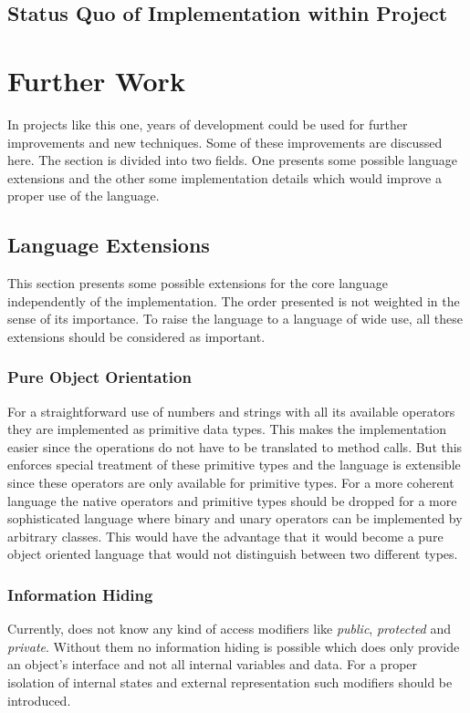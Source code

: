 \subsection{Status Quo of Implementation within Project}
\label{sec:statusQuo}

\section{Further Work}
\label{sec:futureWork}
In projects like this one, years of development could be used for
further improvements and new techniques. Some of these improvements are
discussed here. The section is divided into two fields. One presents some
possible language extensions and the other some implementation details
which would improve a proper use of the language.

\subsection{Language Extensions}
This section presents some possible extensions for the core language
independently of the implementation. The order presented is not weighted
in the sense of its importance. To raise the language to a language
of wide use, all these extensions should be considered as important.

\subsubsection{Pure Object Orientation}
For a straightforward use of numbers and strings with all its available
operators they are implemented as primitive data types. This makes the
implementation easier since the operations do not have to be translated
to method calls. But this enforces special treatment of these primitive types
and the language is extensible since these operators are only available for primitive
types. For a more coherent language the native operators and primitive types should
be dropped for a more sophisticated language where binary and unary operators can be
implemented by arbitrary classes. This would have the advantage that it
would become a pure object oriented language that would not distinguish
between two different types.

\subsubsection{Information Hiding}
Currently, \ooplss does not know any kind of access modifiers like
\emph{public}, \emph{protected} and \emph{private}. Without them no
information hiding is possible which does only provide an object's interface
and not all internal variables and data. For a proper isolation of
internal states and external representation such modifiers should be
introduced.

